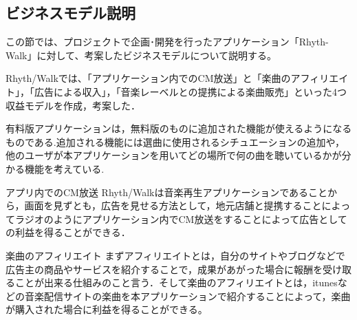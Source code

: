 \subsection{ビジネスモデル説明}
\par
この節では、プロジェクトで企画･開発を行ったアプリケーション「Rhyth-Walk」に対して、考案したビジネスモデルについて説明する。
\par
Rhyth/Walkでは、「アプリケーション内でのCM放送」と「楽曲のアフィリエイト」，「広告による収入」，「音楽レーベルとの提携による楽曲販売」といった4つ収益モデルを作成，考案した．\par
有料版アプリケーションは，無料版のものに追加された機能が使えるようになるものである.追加される機能には選曲に使用されるシチュエーションの追加や，他のユーザが本アプリケーションを用いてどの場所で何の曲を聴いているかが分かる機能を考えている.
\par
\item アプリ内でのCM放送
Rhyth/Walkは音楽再生アプリケーションであることから，画面を見ずとも，広告を見せる方法として，地元店舗と提携することによってラジオのようにアプリケーション内でCM放送をすることによって広告としての利益を得ることができる．
\par
\item 楽曲のアフィリエイト
まずアフィリエイトとは，自分のサイトやブログなどで広告主の商品やサービスを紹介することで，成果があがった場合に報酬を受け取ることが出来る仕組みのこと言う．そして楽曲のアフィリエイトとは，itunesなどの音楽配信サイトの楽曲を本アプリケーションで紹介することによって，楽曲が購入された場合に利益を得ることができる。
